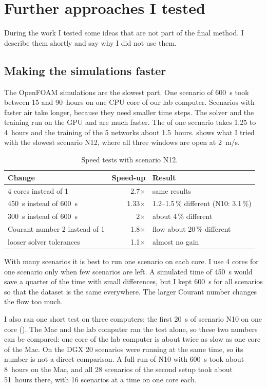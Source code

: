 \chapter{Further approaches I tested}
\label{ch:notused}

During the work I tested some ideas that are not part of the final method. I describe them shortly and say
why I did not use them.

\section{Making the simulations faster}
The OpenFOAM simulations are the slowest part. One scenario of 600~s took between 15 and 90~hours on one CPU
core of our lab computer. Scenarios with faster air take longer, because they need smaller time steps. The
\cotwo{} solver and the training run on the GPU and are much faster. The \cotwo{} of one scenario takes 1.25 to
4~hours and the training of the 5 networks about 1.5~hours.  shows what I tried with the
slowest scenario N12, where all three windows are open at 2~m/s.

\begin{table}[h]
  \centering
  \caption{Speed tests with scenario N12.}
  \label{tab:speed}
  \begin{tabular}{>{\raggedright}p{5cm}rp{6.3cm}}
    \toprule
    Change & Speed-up & Result\\
    \midrule
    4 cores instead of 1 & 2.7$\times$ & same results\\
    450~s instead of 600~s & 1.33$\times$ & \cotwo{} 1.2--1.5\,\% different (N10: 3.1\,\%)\\
    300~s instead of 600~s & 2$\times$ & about 4\,\% different\\
    Courant number 2 instead of 1 & 1.8$\times$ & flow about 20\,\% different\\
    looser solver tolerances & 1.1$\times$ & almost no gain\\
    \bottomrule
  \end{tabular}
\end{table}

With many scenarios it is best to run one scenario on each core. I use 4 cores for one scenario only when few
scenarios are left. A simulated time of 450~s would save a quarter of the time with small differences, but I
kept 600~s for all scenarios so that the dataset is the same everywhere. The larger Courant number changes the
flow too much.

I also ran one short test on three computers: the first 20~s of scenario N10 on one core (). The
Mac and the lab computer ran the test alone, so these two numbers can be compared: one core of the lab computer
is about twice as slow as one core of the Mac. On the DGX 20 scenarios were running at the same time, so its
number is not a direct comparison. A full run of N10 with 600~s took about 8~hours on the Mac, and all 28
scenarios of the second setup took about 51~hours there, with 16 scenarios at a time on one core each.

